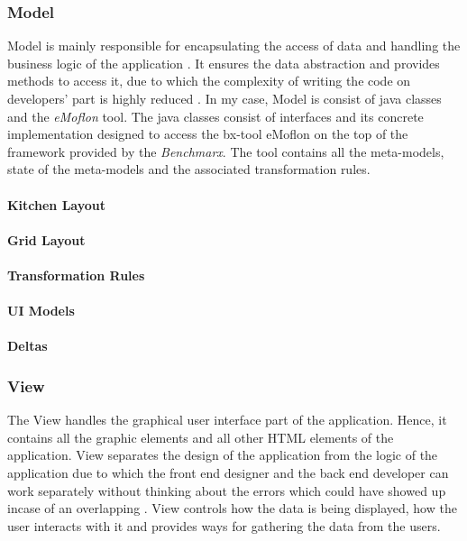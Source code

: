 \subsubsection{Model}\label{subsubsec:model}
Model is mainly responsible for encapsulating the access of data and handling the business logic of the application \cite{designpattern-headfirst} \cite{mvc-arch}. It ensures the data abstraction and provides methods to access it, due to which the complexity of writing the code on developers' part is highly reduced \cite{mdd-webwithmvc}.
\newline\newline In my case, Model is consist of java classes and the \textit{eMoflon} tool. The java classes consist of interfaces and its concrete implementation designed to access the bx-tool eMoflon on the top of the framework provided by the \textit{Benchmarx}. The tool contains all the meta-models, state of the meta-models and the associated transformation rules.
\paragraph{Kitchen Layout}
\paragraph{Grid Layout}
\paragraph{Transformation Rules}
\paragraph{UI Models}
\paragraph{Deltas}

\subsubsection{View}\label{subsubsec:view}
The View handles the graphical user interface part of the application. Hence, it contains all the graphic elements and all other HTML elements of the application. View separates the design of the application from the logic of the application due to which the front end designer and the back end developer can work separately without thinking about the errors which could have showed up incase of an overlapping \cite{designpattern-headfirst} \cite{mvc-arch}. View controls how the data is being displayed, how the user interacts with it and provides ways for gathering the data from the users. 

